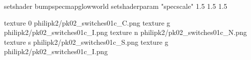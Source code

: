 setshader bumpspecmapglowworld
setshaderparam "specscale" 1.5 1.5 1.5


texture 0 philipk2/pk02_switches01c_C.png
texture g philipk2/pk02_switches01c_I.png
texture n philipk2/pk02_switches01c_N.png
texture s philipk2/pk02_switches01c_S.png
texture g philipk2/pk02_switches01c_I.png

